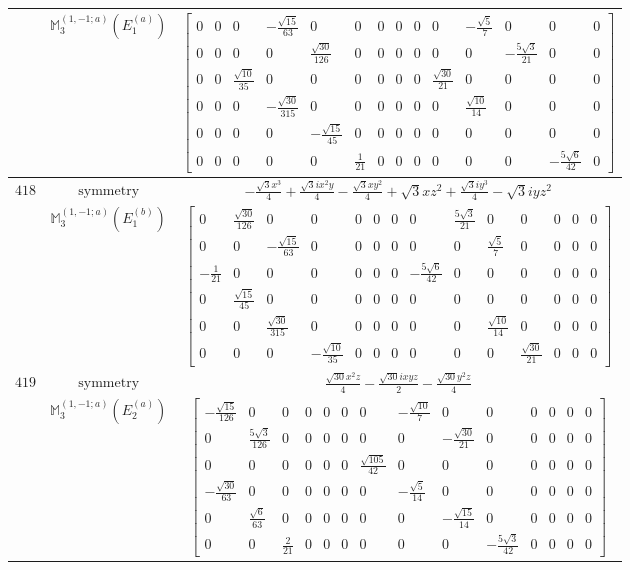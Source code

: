 \documentclass[fleqn,8pt,landscape]{jsarticle}
\begin{document}
\begin{longtable}{ccc}
$  $ & $ \mathbb{M}_{3}^{(1,-1;a)}(E_{1}^{(a)}) $ & $ \begin{bmatrix} 0 & 0 & 0 & - \frac{\sqrt{15}}{63} & 0 & 0 & 0 & 0 & 0 & 0 & - \frac{\sqrt{5}}{7} & 0 & 0 & 0 \\ 0 & 0 & 0 & 0 & \frac{\sqrt{30}}{126} & 0 & 0 & 0 & 0 & 0 & 0 & - \frac{5 \sqrt{3}}{21} & 0 & 0 \\ 0 & 0 & \frac{\sqrt{10}}{35} & 0 & 0 & 0 & 0 & 0 & 0 & \frac{\sqrt{30}}{21} & 0 & 0 & 0 & 0 \\ 0 & 0 & 0 & - \frac{\sqrt{30}}{315} & 0 & 0 & 0 & 0 & 0 & 0 & \frac{\sqrt{10}}{14} & 0 & 0 & 0 \\ 0 & 0 & 0 & 0 & - \frac{\sqrt{15}}{45} & 0 & 0 & 0 & 0 & 0 & 0 & 0 & 0 & 0 \\ 0 & 0 & 0 & 0 & 0 & \frac{1}{21} & 0 & 0 & 0 & 0 & 0 & 0 & - \frac{5 \sqrt{6}}{42} & 0 \end{bmatrix} $ \\ \hline
$ 418 $ & $ \text{symmetry} $ & $ - \frac{\sqrt{3} x^{3}}{4} + \frac{\sqrt{3} i x^{2} y}{4} - \frac{\sqrt{3} x y^{2}}{4} + \sqrt{3} x z^{2} + \frac{\sqrt{3} i y^{3}}{4} - \sqrt{3} i y z^{2} $ \\
$  $ & $ \mathbb{M}_{3}^{(1,-1;a)}(E_{1}^{(b)}) $ & $ \begin{bmatrix} 0 & \frac{\sqrt{30}}{126} & 0 & 0 & 0 & 0 & 0 & 0 & \frac{5 \sqrt{3}}{21} & 0 & 0 & 0 & 0 & 0 \\ 0 & 0 & - \frac{\sqrt{15}}{63} & 0 & 0 & 0 & 0 & 0 & 0 & \frac{\sqrt{5}}{7} & 0 & 0 & 0 & 0 \\ - \frac{1}{21} & 0 & 0 & 0 & 0 & 0 & 0 & - \frac{5 \sqrt{6}}{42} & 0 & 0 & 0 & 0 & 0 & 0 \\ 0 & \frac{\sqrt{15}}{45} & 0 & 0 & 0 & 0 & 0 & 0 & 0 & 0 & 0 & 0 & 0 & 0 \\ 0 & 0 & \frac{\sqrt{30}}{315} & 0 & 0 & 0 & 0 & 0 & 0 & \frac{\sqrt{10}}{14} & 0 & 0 & 0 & 0 \\ 0 & 0 & 0 & - \frac{\sqrt{10}}{35} & 0 & 0 & 0 & 0 & 0 & 0 & \frac{\sqrt{30}}{21} & 0 & 0 & 0 \end{bmatrix} $ \\ \hline
$ 419 $ & $ \text{symmetry} $ & $ \frac{\sqrt{30} x^{2} z}{4} - \frac{\sqrt{30} i x y z}{2} - \frac{\sqrt{30} y^{2} z}{4} $ \\
$  $ & $ \mathbb{M}_{3}^{(1,-1;a)}(E_{2}^{(a)}) $ & $ \begin{bmatrix} - \frac{\sqrt{15}}{126} & 0 & 0 & 0 & 0 & 0 & 0 & - \frac{\sqrt{10}}{7} & 0 & 0 & 0 & 0 & 0 & 0 \\ 0 & \frac{5 \sqrt{3}}{126} & 0 & 0 & 0 & 0 & 0 & 0 & - \frac{\sqrt{30}}{21} & 0 & 0 & 0 & 0 & 0 \\ 0 & 0 & 0 & 0 & 0 & 0 & \frac{\sqrt{105}}{42} & 0 & 0 & 0 & 0 & 0 & 0 & 0 \\ - \frac{\sqrt{30}}{63} & 0 & 0 & 0 & 0 & 0 & 0 & - \frac{\sqrt{5}}{14} & 0 & 0 & 0 & 0 & 0 & 0 \\ 0 & \frac{\sqrt{6}}{63} & 0 & 0 & 0 & 0 & 0 & 0 & - \frac{\sqrt{15}}{14} & 0 & 0 & 0 & 0 & 0 \\ 0 & 0 & \frac{2}{21} & 0 & 0 & 0 & 0 & 0 & 0 & - \frac{5 \sqrt{3}}{42} & 0 & 0 & 0 & 0 \end{bmatrix} $ \\ \hline

\end{longtable}
\end{document}
